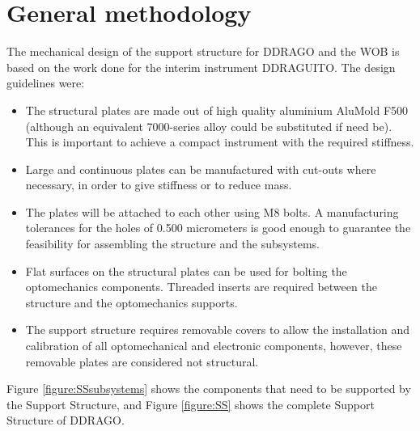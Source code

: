 \documentclass{report}
\begin{document}
\section {General methodology}

The mechanical design of the support structure for DDRAGO and the WOB is based on the work done for the interim instrument DDRAGUITO. The design guidelines were:

\begin{itemize}
\item The structural plates are made out of high quality aluminium AluMold F500 (although an equivalent 7000-series alloy could be substituted if need be). This is important to achieve a compact instrument with the required stiffness.
\item Large and continuous plates can be manufactured with cut-outs where necessary, in order to give stiffness or to reduce mass.
\item The plates will be attached to each other using M8 bolts. A manufacturing tolerances for the holes of 0.500 micrometers is good enough to guarantee the feasibility for assembling the structure and the subsystems.
\item Flat surfaces on the structural plates can be used for bolting the optomechanics components. Threaded inserts are required between the structure and the optomechanics supports.
\item The support structure requires removable covers to allow the installation and calibration of all optomechanical and electronic components, however, these removable plates are considered not structural.
\end{itemize}

Figure \ref{figure:SSsubsystems} shows the components that need to be supported by the Support Structure, and Figure \ref{figure:SS} shows the complete Support Structure of DDRAGO.
\end{document}
